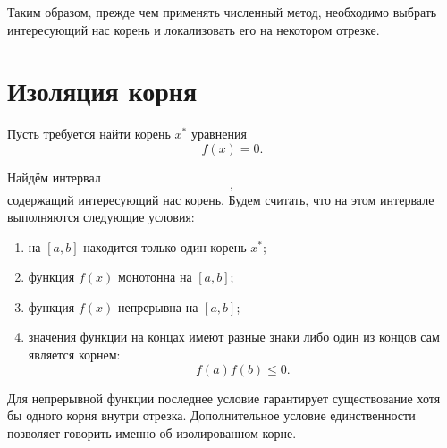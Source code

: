 \documentclass[../final.tex]{subfiles}
\begin{document}
Таким образом, прежде чем применять численный метод, необходимо
выбрать интересующий нас корень и локализовать его на некотором
отрезке.


\section{Изоляция корня}

Пусть требуется найти корень $x^*$ уравнения
%
\begin{equation*}
    f(x)=0.
\end{equation*}

Найдём интервал
%
\begin{equation*}
    [a,b],
\end{equation*}
%
содержащий интересующий нас корень. Будем считать, что на этом
интервале выполняются следующие условия:

\begin{enumerate}[label=\arabic*)]
    \item на $[a,b]$ находится только один корень $x^*$;
    \item функция $f(x)$ монотонна на $[a,b]$;
    \item функция $f(x)$ непрерывна на $[a,b]$;
    \item значения функции на концах имеют разные знаки либо один
    из концов сам является корнем:
    \begin{equation*}
        f(a)f(b)\leq0.
    \end{equation*}
\end{enumerate}

Для непрерывной функции последнее условие гарантирует существование
хотя бы одного корня внутри отрезка. Дополнительное условие
единственности позволяет говорить именно об изолированном корне.

\begin{center}

\end{center}
\end{document}
